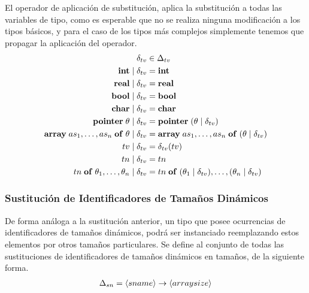 El operador de aplicación de substitución, aplica la substitución a todas las variables de tipo, como es esperable que no se realiza ninguna modificación a los tipos básicos, y para el caso de los tipos más complejos simplemente tenemos que propagar la aplicación del operador.
\begin{align*}
\delta_{tv}
&\in
\Delta_{tv}
\\
\mathbf{int} \mid \delta_{tv}
&=
\mathbf{int}
\\
\mathbf{real} \mid \delta_{tv}
&=
\mathbf{real}
\\
\mathbf{bool} \mid \delta_{tv}
&=
\mathbf{bool}
\\
\mathbf{char} \mid \delta_{tv}
&=
\mathbf{char}
\\
\mathbf{pointer} \; \theta \mid \delta_{tv}
&=
\mathbf{pointer} \; (\theta \mid \delta_{tv})
\\
\mathbf{array} \; as_1, \ldots, as_n \; \mathbf{of} \; \theta \mid \delta_{tv}
&=
\mathbf{array} \; as_1, \ldots, as_n \; \mathbf{of} \; (\theta \mid \delta_{tv})
\\
tv \mid \delta_{tv}
&=
\delta_{tv}(tv)
\\
tn \mid \delta_{tv}
&=
tn
\\
tn \; \mathbf{of} \; \theta_1, \ldots, \theta_n \mid \delta_{tv}
&=
tn \; \mathbf{of} \; (\theta_1 \mid \delta_{tv}), \ldots, (\theta_n \mid \delta_{tv})
\end{align*}

\subsubsection{Sustitución de Identificadores de Tamaños Dinámicos}

De forma análoga a la sustitución anterior, un tipo que posee ocurrencias de identificadores de tamaños dinámicos, podrá ser instanciado reemplazando estos elementos por otros tamaños particulares.
Se define al conjunto de todas las sustituciones de identificadores de tamaños dinámicos en tamaños, de la siguiente forma.
\begin{gather*}
\Delta_{sn} = \langle sname \rangle \rightarrow \langle arraysize \rangle
\end{gather*}

